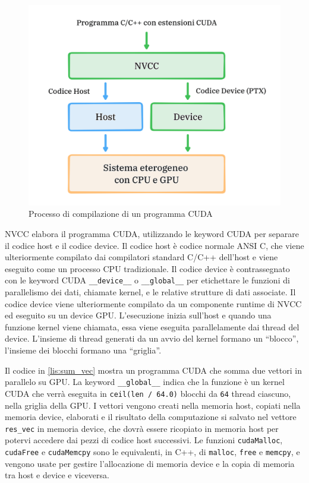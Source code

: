 \begin{figure}[ht]
    \centering
    \includegraphics[width=.9\linewidth]{images/chapter2/nvcc.png}
    \caption{Processo di compilazione di un programma CUDA}
    \label{fig:nvcc}
\end{figure}

NVCC elabora il programma CUDA, utilizzando le keyword CUDA per separare il codice host e il codice device. Il codice host è codice normale ANSI C, che viene ulteriormente compilato dai compilatori standard C/C++ dell'host e viene eseguito come un processo CPU tradizionale. Il codice device è contrassegnato con le keyword CUDA \verb|__device__| o \verb|__global__| per etichettare le funzioni di parallelismo dei dati, chiamate kernel, e le relative strutture di dati associate. Il codice device viene ulteriormente compilato da un componente runtime di NVCC ed eseguito su un device GPU. L'esecuzione inizia sull'host e quando una funzione kernel viene chiamata, essa viene eseguita parallelamente dai thread del device. L'insieme di thread generati da un avvio del kernel formano un ``blocco'', l'insieme dei blocchi formano una ``griglia''.

 

Il codice in \ref*{lis:sum_vec} mostra un programma CUDA che somma due vettori in parallelo su GPU. La keyword \verb|__global__| indica che la funzione è un kernel CUDA che verrà eseguita in \verb|ceil(len / 64.0)| blocchi da \verb|64| thread ciascuno, nella griglia della GPU. I vettori vengono creati nella memoria host, copiati nella memoria device, elaborati e il risultato della computazione si salvato nel vettore \verb|res_vec| in memoria device, che dovrà essere ricopiato in memoria host per potervi accedere dai pezzi di codice host successivi. Le funzioni \verb|cudaMalloc|, \verb|cudaFree| e \verb|cudaMemcpy| sono le equivalenti, in C++, di \verb|malloc|, \verb|free| e \verb|memcpy|, e vengono usate per gestire l'allocazione di memoria device e la copia di memoria tra host e device e viceversa.

